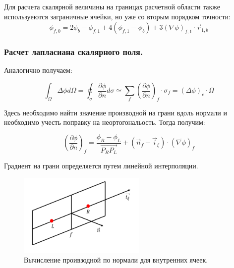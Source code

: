  Для расчета скалярной величины на границах расчетной области также используеются заграничные ячейки, но уже со вторым порядком точности:
 \begin{equation}
    \phi_{f,0} = 2\phi_b-\phi_{f,1}+4(\phi_{f,1}-\phi_b)+3(\nabla\phi)_{f,1}\cdot\vec{r}_{1,b}
 \end{equation}

\subsubsection{Расчет лапласиана скалярного поля.}
Аналогично получаем:

\begin{equation}
    \int_\Omega\Delta\phi d\Omega = \oint_\sigma\frac{\partial \phi}{\partial n}d \sigma \simeq\sum_f(\frac{\partial\phi}{\partial n})_f\cdot\sigma_f = (\Delta\phi)_c\cdot\Omega
\end{equation}

Здесь необходимо найти значение производной на грани вдоль нормали и необходимо учесть поправку на неортогональость. Тогда получим:

\begin{equation}
    (\frac{\partial\phi}{\partial n})_f =\frac{\phi_R-\phi_L}{\vec{P_RP_L}}+(\vec{n}_f-\vec{i}_\xi)\cdot(\overline{\nabla\phi})_f
\end{equation}

Градиент на грани определяется путем линейной интерполяции. 

\begin{figure}[H]
    \centering
    \includegraphics[width=0.55\textwidth]{img/7.png}
    \caption{Вычисление проивзодной по нормали для внутренних ячеек.}
    \label{fig:7}
\end{figure}

